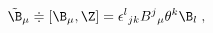 \begin{equation}
\label{e5:53}
\tilde{\B}_{\mu} \doteqdot [\B_{\mu},\Z]= \epsilon^l{}_{jk}B^j{}_{\mu}\theta^k \B_l \;,
\end{equation}

